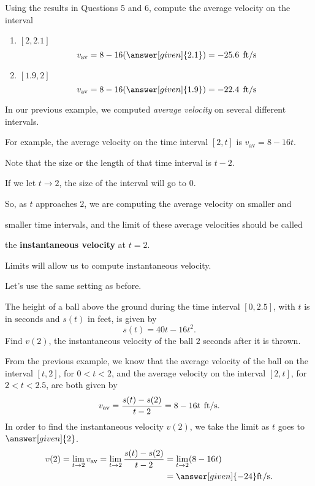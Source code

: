 \documentclass{ximera}
\begin{document}
\begin{example}
\begin{question}
\end{question}
\begin {question}
 Using the results in Questions 5 and 6,  compute the average velocity on the interval
\begin{enumerate}
\item $[2, 2.1]$
\[
v_{\text{av}} =  8-16(\answer[given]{2.1})=-25.6 \hspace{0.06in}\mathrm{ft}/\mathrm{s}
\]
\item $[1.9,2]$
\[
v_{\text{av}} =  8-16(\answer[given]{1.9})=-22.4 \hspace{0.06in}\mathrm{ft}/\mathrm{s}
\]
\end{enumerate}
\end{question}
\end{example}

In our previous example, we computed \textit{average velocity} on
several different intervals.

 For example, the average velocity on the time interval  $[2,t]$ is  $v_{\text{av}}=8-16t$.
 
Note that the size or the length of that time interval is $t-2$.

 If we let $t\to 2$, the size of the interval will go to $0$.
 
  So, as $t$ approaches $2$,  we are computing the average velocity on smaller and
  
   smaller time intervals, and the limit of these average velocities  should be called 
 

    the \textbf{instantaneous velocity} at $t=2$.
 
 
  Limits will allow us to compute instantaneous velocity.
  
    Let's use the same setting as before.


\begin{example}
The height of a ball above the ground during the time interval  $[0,2.5]$, with $t$ is in seconds and $s(t)$ in feet, 
is given by
\[
s(t) = 40t - 16t^2.
\] 
Find $v(2)$, the instantaneous velocity of the ball $2$ seconds after it
is thrown.

\begin{explanation}
From the previous example, we know that the average velocity of the
ball on the interval $[t,2]$, for $0<t<2$, and the average velocity
on the interval $[2,t]$, for $2<t<2.5$, are both given by
\[
v_{\text{av}} =  \frac{s(t)-s(2)}{t-2}= 8-16t \hspace{0.06in}\mathrm{ft}/\mathrm{s}.
\]
In order to find the instantaneous velocity $v(2)$, we 
take the limit as $t$ goes to $\answer[given]{2}$. 
\begin{align*}
v (2)= \lim_{t\to2}v_{\text{av}}
=\lim_{t\to2}  \frac{s(t)-s(2)}{t-2}
&= \lim_{t\to2}(8-16t)\\
&= \answer[given]{-24}\mathrm{ft}/\mathrm{s}.
\end{align*}
\end{explanation}
\end{example}
\end{document}
